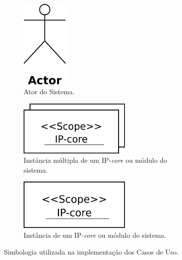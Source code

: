 \documentclass{article}
\begin{document}
  \FloatBarrier
  \begin{figure}[H]
    \centering
    \begin{subfigure}[b]{0.3\textwidth}
      \centering
      \includegraphics[width=0.25\textwidth]{actor_exemple.png}
      \caption{Ator do Sistema.}
      \label{fig:actor_exemple}
    \end{subfigure} 
    \begin{subfigure}[b]{0.3\textwidth}
      \centering
      \includegraphics[width=0.6\textwidth]{ipcore_exemple.png}
      \caption{Instância múltipla de um IP-\textit{core} ou módulo do sistema.}
      \label{fig:ipcore_exemple}
    \end{subfigure}
    \begin{subfigure}[b]{0.3\textwidth}
      \centering
      \includegraphics[width=0.6\textwidth]{ipcore_single_exemple.png}
      \caption{Instância de um IP-\textit{core} ou módulo do sistema.}
      \label{fig:ipcore_single_exemple}
    \end{subfigure}
    \caption{Simbologia utilizada na implementação dos Casos de Uso.}
    \label{fig:actors}
  \end{figure}
  
\end{document}
